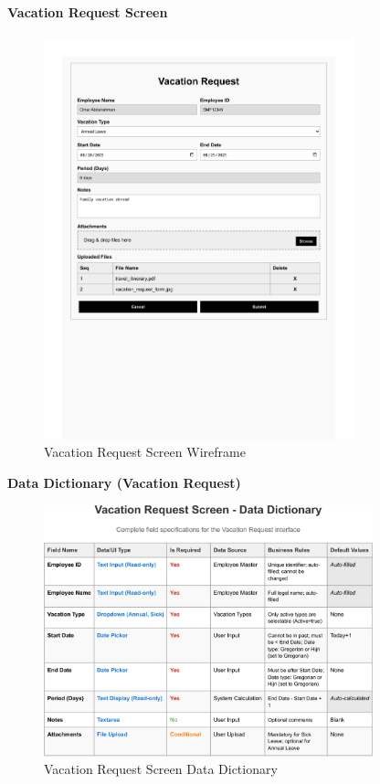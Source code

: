 \documentclass[12pt,a4paper]{article}
\begin{document}
\paragraph{Vacation Request Screen}
\begin{figure}[H]
\centering
\includegraphics[width=0.8\textwidth]{Wireframes/Vacation-Request/Vacation-Request-1.png}
\caption{Vacation Request Screen Wireframe}
\label{fig:wireframe-vacation-request}
\end{figure}

\noindent\textbf{Data Dictionary (Vacation Request)}
\begin{figure}[H]
\centering
\includegraphics[width=0.85\textwidth]{Data-Dictionary/Screen-Data-Dictionaries/Vacation-Request-Screen-Data-Dictionary/Vacation-Request-Screen-Data-Dictionary-1.png}
\caption{Vacation Request Screen Data Dictionary}
\label{fig:vacation-request-data-dict-inline}
\end{figure}
\end{document}
